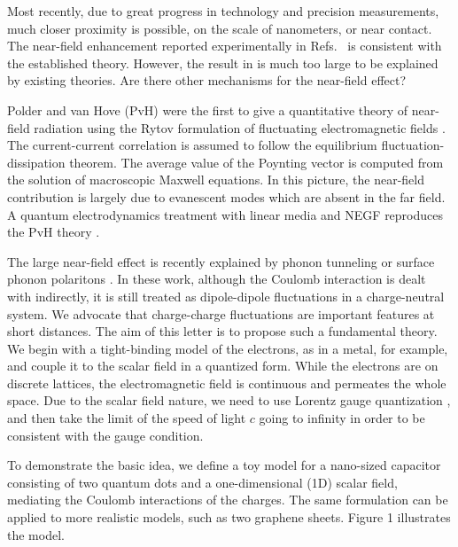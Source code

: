 \documentclass[doublecol]{epl2}
\begin{document}
Most recently, due to great progress in technology and precision measurements, much closer proximity is possible, on the scale of nanometers, or near contact. 
The near-field enhancement reported experimentally 
in Refs.~\cite{kimsong2015,song2016}
is consistent with the established theory.
However, the result in 
\cite{Kloppstech2015} is much too large to be explained by  
existing theories.  Are there other mechanisms for the near-field effect? 

Polder and van Hove (PvH) \cite{PvH} were the first to give a quantitative theory of near-field radiation using the Rytov formulation of fluctuating electromagnetic fields \cite{Rytov,bimonte16}.  The current-current correlation is assumed to follow the equilibrium fluctuation-dissipation theorem.  The average value of the Poynting vector is computed from the solution of macroscopic Maxwell equations.   In this picture, the near-field contribution is largely due to evanescent modes which are absent in the far field.  
A quantum electrodynamics treatment with linear media and NEGF reproduces the PvH theory \cite{Janowicz03}.

The large near-field effect is recently explained by phonon tunneling or surface
phonon polaritons 
\cite{mahanAPL11,xiong14,chiloyan14}.   In these work, although the Coulomb interaction is  dealt with indirectly, 
it is still treated as dipole-dipole fluctuations in a charge-neutral system.  We advocate that charge-charge fluctuations are important features
at short distances. 
The aim of this letter is to propose such a fundamental theory. 
We begin with
a tight-binding model of the electrons, as in a metal, for example, and couple it
to the scalar field in a quantized form.  While the electrons are on discrete lattices, the electromagnetic field 
is continuous and permeates the whole space.   Due to the scalar field nature, we need to use 
Lorentz gauge quantization \cite{tannoudji-book}, and then take the limit of the speed of light $c$ going to 
infinity in order to be consistent with the gauge condition. 

To demonstrate the basic idea, we define a toy
model for a nano-sized capacitor consisting of two quantum dots and a one-dimensional (1D) scalar field, mediating 
the Coulomb interactions of the charges.  
The same formulation can be applied to more realistic models, such as two graphene sheets. 
Figure 1 illustrates the model.
\end{document}
